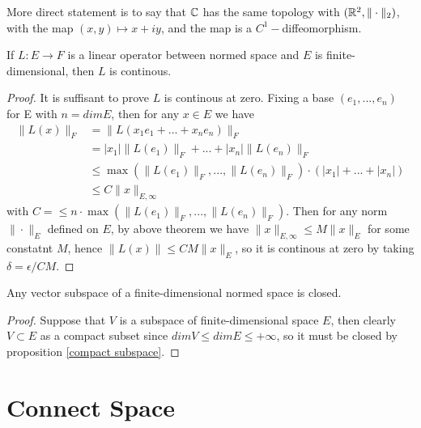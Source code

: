 \documentclass[en,hazy,blue,noraml,12pt]{elegantnote}
\begin{document}
More direct statement is to say that \(\mathbb{C}\) has the same topology with \((\mathbb{R}^2,\|\cdot\|_2)\), with the map \((x,y) \mapsto x+iy\), and the map is a \(C^1-\)diffeomorphism.
\begin{corollary}
    If \(L:E \to F\) is a linear operator between normed space and \(E\) is finite-dimensional, then \(L\) is continous.

    \begin{proof}
        It is suffisant to prove \(L\) is continous at zero. Fixing a base \((e_1,...,e_n)\) for E  with \(n = dim E\), then for any \(x\in E\) we have 
        \begin{align*}
            \|L(x)\|_F &= \|L(x_1e_1+...+x_ne_n)\|_F \\
            &= |x_1|\|L(e_1)\|_F+...+|x_n|\|L(e_n)\|_F \\
            &\leq \max(\|L(e_1)\|_F,...,\|L(e_n)\|_F) \cdot (|x_1|+...+|x_n|) \\
            &\leq C\|x\|_{E,\infty}
        \end{align*}
        with \(C = \leq n\cdot\max(\|L(e_1)\|_F,...,\|L(e_n)\|_F)\). Then for any norm \(\|\cdot\|_E\) defined on \(E\), by above theorem we have \(\|x\|_{E,\infty} \leq M\|x\|_E\) for some constatnt \(M\), hence \(\|L(x)\| \leq CM\|x\|_E\), so it is continous at zero by taking \(\delta = \epsilon/CM\).
    \end{proof}
\end{corollary}


\begin{corollary}
    Any vector subspace of a finite-dimensional normed space is closed.
    \begin{proof}
        Suppose that \(V\) is a subspace of finite-dimensional space \(E\), then clearly \(V \subset E\) as a compact subset since \(dimV \leq dimE \leq +\infty\), so it must be closed by proposition \ref{compact subspace}.
    \end{proof}
\end{corollary}



\section{Connect Space}
\end{document}
